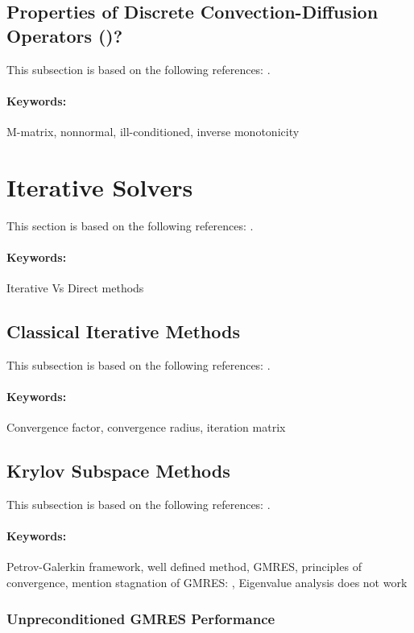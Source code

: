 \subsection{Properties of Discrete Convection-Diffusion Operators (\A)?}
\label{back:convdiff:A}
This subsection is based on the following references: \cite{EchLieSzyTic18, EchLieTic19}.
\paragraph{Keywords:} M-matrix, nonnormal, ill-conditioned, inverse monotonicity


\section{Iterative Solvers}
This section is based on the following references: \cite{BenFroNabSzy01, ChaMat94, DolJolNat15, Gan08, Gre97, LanRosSzy91, LieStr12, LieStr03, MacOriShi00, MacOriShi02, Sch69, Saa03, TosWid05, Var09}.
\paragraph{Keywords:} Iterative Vs Direct methods


\subsection{Classical Iterative Methods}
\label{back:itersolvers:class_sol}
This subsection is based on the following references: \cite{Saa03, Var09}.
\paragraph{Keywords:} Convergence factor, convergence radius, iteration matrix


\subsection{Krylov Subspace Methods}
\label{back:itersolvers:krylov}
This subsection is based on the following references: \cite{Gre97, LieStr12}.
\paragraph{Keywords:} Petrov-Galerkin framework, well defined method, GMRES, principles of convergence, mention stagnation of GMRES: \cite{LieStr03}, Eigenvalue analysis does not work


\subsubsection{Unpreconditioned GMRES Performance}
\label{back:itersolvers:krylov:unprec}

